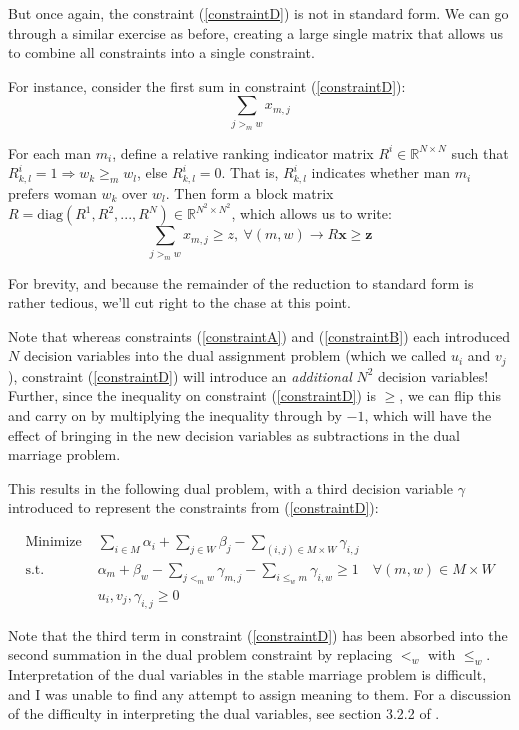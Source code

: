 \documentclass[twoside]{article}
\begin{document}
But once again, the constraint (\ref{constraintD}) is not in standard form. We can go through a similar exercise as before, creating a large single matrix that allows us to combine all constraints into a single constraint. 

For instance, consider the first sum in constraint (\ref{constraintD}):
\[
\sum_{j >_m w}x_{m,j}
\]

For each man $m_i$, define a relative ranking indicator matrix $R^i \in \mathbb{R}^{N \times N}$ such that $R^i_{k,l}=1 \Rightarrow w_k \geq_m w_l$, else $R^i_{k,l}=0$. That is, $R^i_{k,l}$ indicates whether man $m_i$ prefers woman $w_k$ over $w_l$. Then form a block matrix $R=\text{diag}(R^1, R^2, ..., R^N) \in \mathbb{R}^{N^2 \times N^2}$, which allows us to write:
\[
\sum_{j >_m w}x_{m,j} \geq z, \> \forall(m,w) \rightarrow R\textbf{x} \geq \textbf{z}
\]

For brevity, and because the remainder of the reduction to standard form is rather tedious, we'll cut right to the chase at this point.

Note that whereas constraints (\ref{constraintA}) and (\ref{constraintB}) each introduced $N$ decision variables into the dual assignment problem (which we called $u_i$ and $v_j$), constraint (\ref{constraintD}) will introduce an \textit{additional} $N^2$ decision variables! Further, since the inequality on constraint (\ref{constraintD}) is $\geq$, we can flip this and carry on by multiplying the inequality through by $-1$, which will have the effect of bringing in the new decision variables as subtractions in the dual marriage problem.

This results in the following dual problem, with a third decision variable $\gamma$ introduced to represent the constraints from (\ref{constraintD}):

\begin{align*}
    \text{Minimize } &\sum_{i\in M}\alpha_i + \sum_{j\in W}\beta_j - \sum_{(i,j) \in M \times W} \gamma_{i,j}\\
    \text{s.t. }&\alpha_m + \beta_w - \sum_{j <_m w} \gamma_{m,j} - \sum_{i \leq_w m} \gamma_{i,w}  \geq 1 \quad \forall (m,w) \in M \times W\\
    & u_i, v_j, \gamma_{i,j} \geq 0
\end{align*}

Note that the third term in constraint (\ref{constraintD}) has been absorbed into the second summation in the dual problem constraint by replacing $<_w$ with $\leq_w$. 
Interpretation of the dual variables in the stable marriage problem is difficult, and I was unable to find any attempt to assign meaning to them. For a discussion of the difficulty in interpreting the dual variables, see section 3.2.2 of \cite{wangthesis}.
\end{document}
